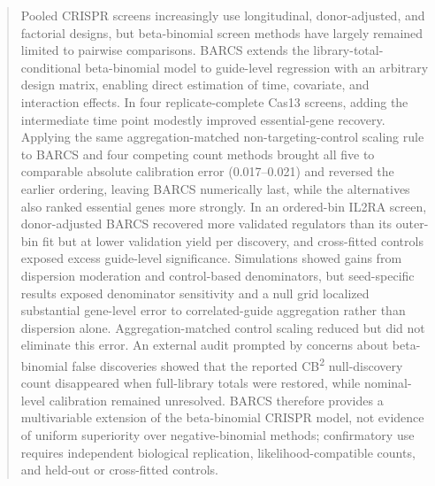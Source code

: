 \begin{abstract}
Pooled CRISPR screens increasingly use longitudinal, donor-adjusted, and
factorial designs, but beta-binomial screen methods have largely remained
limited to pairwise comparisons.  BARCS extends the
library-total-conditional beta-binomial model to guide-level regression with
an arbitrary design matrix, enabling direct estimation of time, covariate, and
interaction effects.  In four replicate-complete Cas13 screens, adding the
intermediate time point modestly improved essential-gene recovery.  Applying
the same aggregation-matched non-targeting-control scaling rule to BARCS and
four competing count methods brought all five to comparable absolute
calibration error (0.017--0.021) and reversed the earlier ordering, leaving
BARCS numerically last, while the alternatives also ranked essential genes
more strongly.  In an ordered-bin IL2RA screen, donor-adjusted BARCS recovered
more validated regulators than its outer-bin fit but at lower validation yield
per discovery, and cross-fitted controls exposed excess guide-level
significance.
Simulations showed gains from dispersion moderation and control-based
denominators, but seed-specific results exposed denominator sensitivity and a
null grid localized substantial gene-level error to correlated-guide
aggregation rather than dispersion alone.  Aggregation-matched control scaling
reduced but did not eliminate this error.  An external
audit prompted by concerns about beta-binomial false discoveries showed that
the reported CB\textsuperscript{2} null-discovery count disappeared when
full-library totals were restored, while nominal-level calibration remained
unresolved.  BARCS therefore provides a multivariable extension of the
beta-binomial CRISPR model, not evidence of uniform superiority over
negative-binomial methods; confirmatory use requires independent biological
replication, likelihood-compatible counts, and held-out or cross-fitted
controls.
\end{abstract}
